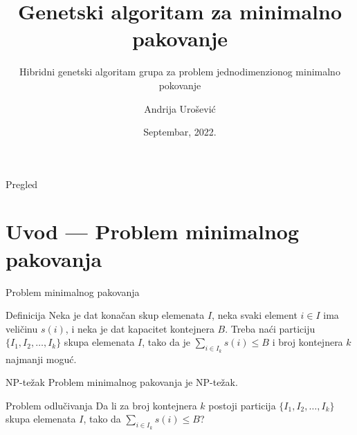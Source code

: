 \documentclass[aspectratio=169,xcolor=dvipsnames]{beamer}
\title[short title]{Genetski algoritam za minimalno pakovanje}
\subtitle{Hibridni genetski algoritam grupa za problem jednodimenzionog minimalno pokovanje}
\author[andrija] {Andrija Urošević}
\institute[matf]
{%
    Univerzitet u Beogradu\\
    Matematički fakultet
}
\date{Septembar, 2022.}
\begin{document}
\begin{frame}
    \titlepage%
\end{frame}

\begin{frame}{Pregled}
    \tableofcontents
\end{frame}

\section{Uvod --- Problem minimalnog pakovanja}

\begin{frame}{Problem minimalnog pakovanja}
    \begin{block}{Definicija}
        Neka je dat konačan skup elemenata $I$, neka svaki element $i \in I$ 
        ima veličinu $s(i)$, i neka je dat kapacitet 
        kontejnera $B$. Treba naći particiju $\{I_1, I_2, \ldots, I_k\}$ skupa 
        elemenata $I$, tako da je $\sum_{i \in I_k} s(i) \leq B$ i broj 
        kontejnera $k$ najmanji moguć.
    \end{block}
    \begin{exampleblock}{NP-težak}
        Problem minimalnog pakovanja je NP-težak.
    \end{exampleblock}
    \begin{block}{Problem odlučivanja}
        Da li za broj kontejnera $k$ postoji particija 
        $\{I_1, I_2, \ldots, I_k\}$ skupa elemenata $I$, 
        tako da $\sum_{i \in I_k} s(i) \leq B$?
    \end{block}
\end{frame}

\end{document}
